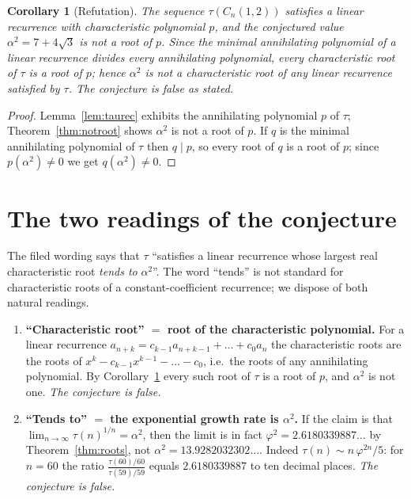\documentclass[11pt]{article}
\newtheorem{corollary}[theorem]{Corollary}
\theoremstyle{definition}
\theoremstyle{remark}
\newcommand{\tauc}{\tau}
\begin{document}
\begin{corollary}[Refutation]
\label{cor:refute}
The sequence $\tauc(C_n(1,2))$ satisfies a linear recurrence with
characteristic polynomial $p$, and the conjectured value
$\alpha^{2} = 7+4\sqrt3$ is not a root of $p$. Since the minimal annihilating
polynomial of a linear recurrence divides every annihilating polynomial, every
characteristic root of $\tauc$ is a root of $p$; hence $\alpha^{2}$ is not a
characteristic root of any linear recurrence satisfied by $\tauc$. The
conjecture is false as stated.
\end{corollary}

\begin{proof}
Lemma~\ref{lem:taurec} exhibits the annihilating polynomial $p$ of $\tauc$;
Theorem~\ref{thm:notroot} shows $\alpha^{2}$ is not a root of $p$. If $q$ is the
minimal annihilating polynomial of $\tauc$ then $q \mid p$, so every root of $q$
is a root of $p$; since $p(\alpha^{2}) \neq 0$ we get $q(\alpha^{2}) \neq 0$.
\end{proof}

\section{The two readings of the conjecture}
\label{sec:readings}

The filed wording says that $\tauc$ ``satisfies a linear recurrence whose
largest real characteristic root \emph{tends to} $\alpha^{2}$''. The word
``tends'' is not standard for characteristic roots of a constant-coefficient
recurrence; we dispose of both natural readings.

\begin{enumerate}
\item \textbf{``Characteristic root'' $=$ root of the characteristic
polynomial.} For a linear recurrence $a_{n+k} = c_{k-1}a_{n+k-1} + \dots +
c_0a_n$ the characteristic roots are the roots of
$x^{k} - c_{k-1}x^{k-1} - \dots - c_0$, i.e.\ the roots of any annihilating
polynomial. By Corollary~\ref{cor:refute} every such root of $\tauc$ is a root
of $p$, and $\alpha^{2}$ is not one. \emph{The conjecture is false.}

\item \textbf{``Tends to'' $=$ the exponential growth rate is $\alpha^{2}$.}
If the claim is that $\lim_{n\to\infty}\tauc(n)^{1/n} = \alpha^{2}$, then the
limit is in fact $\varphi^{2} = 2.6180339887\ldots$ by Theorem~\ref{thm:roots},
not $\alpha^{2} = 13.9282032302\ldots$. Indeed $\tauc(n) \sim n\,\varphi^{2n}/5$:
for $n = 60$ the ratio
$\frac{\tauc(60)/60}{\tauc(59)/59}$ equals $2.6180339887$ to ten decimal places.
\emph{The conjecture is false.}
\end{enumerate}
\end{document}
